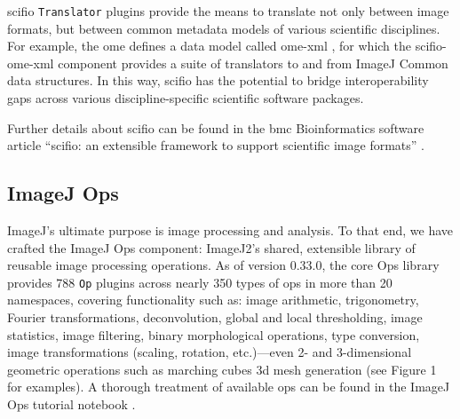\documentclass{bmcart}
\begin{document}
\acrshort{scifio} \texttt{Translator} plugins provide the means to translate
not only between image formats, but between common metadata models of various
scientific disciplines. For example, the \acrfull{ome} defines a data model
called \acrshort{ome}-\acrshort{xml} \cite{ome_xml}, for which the
\acrshort{scifio}-\acrshort{ome}-\acrshort{xml} component provides a suite of
translators to and from ImageJ Common data structures. In this way,
\acrshort{scifio} has the potential to bridge interoperability gaps across
various discipline-specific scientific software packages.

Further details about \acrshort{scifio} can be found in the \acrfull{bmc}
Bioinformatics software article ``\acrshort{scifio}: an extensible framework to
support scientific image formats'' \cite{scifio}.

\subsection*{ImageJ Ops}

ImageJ's ultimate purpose is image processing and analysis. To that end, we
have crafted the ImageJ Ops component: ImageJ2's shared, extensible library of
reusable image processing operations. As of version 0.33.0, the core Ops
library provides 788 \texttt{Op} plugins across nearly 350 types of ops in
more than 20 namespaces, covering functionality such as: image arithmetic,
trigonometry, Fourier transformations, deconvolution, global and local
thresholding, image statistics, image filtering, binary morphological
operations, type conversion, image transformations (scaling, rotation,
etc.)---even 2- and 3-dimensional geometric operations such as marching cubes
\acrshort{3d} mesh generation (see Figure 1 for examples). A thorough
treatment of available ops can be found in the ImageJ Ops tutorial notebook
\cite{imagej_notebooks}.
\end{document}
